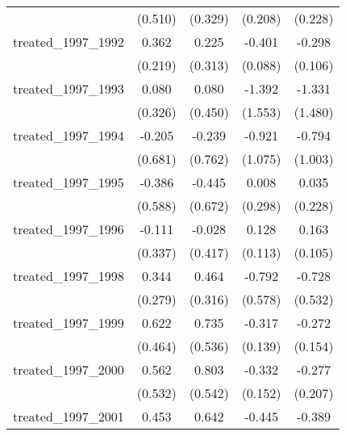 {\begin{tabular}{l*{4}{c}}
            &     (0.510)         &     (0.329)         &     (0.208)         &     (0.228)         \\
[1em]
treated\_1997\_1992&       0.362         &       0.225         &      -0.401\sym{***}&      -0.298\sym{**} \\
            &     (0.219)         &     (0.313)         &     (0.088)         &     (0.106)         \\
[1em]
treated\_1997\_1993&       0.080         &       0.080         &      -1.392         &      -1.331         \\
            &     (0.326)         &     (0.450)         &     (1.553)         &     (1.480)         \\
[1em]
treated\_1997\_1994&      -0.205         &      -0.239         &      -0.921         &      -0.794         \\
            &     (0.681)         &     (0.762)         &     (1.075)         &     (1.003)         \\
[1em]
treated\_1997\_1995&      -0.386         &      -0.445         &       0.008         &       0.035         \\
            &     (0.588)         &     (0.672)         &     (0.298)         &     (0.228)         \\
[1em]
treated\_1997\_1996&      -0.111         &      -0.028         &       0.128         &       0.163         \\
            &     (0.337)         &     (0.417)         &     (0.113)         &     (0.105)         \\
[1em]
treated\_1997\_1998&       0.344         &       0.464         &      -0.792         &      -0.728         \\
            &     (0.279)         &     (0.316)         &     (0.578)         &     (0.532)         \\
[1em]
treated\_1997\_1999&       0.622         &       0.735         &      -0.317\sym{*}  &      -0.272         \\
            &     (0.464)         &     (0.536)         &     (0.139)         &     (0.154)         \\
[1em]
treated\_1997\_2000&       0.562         &       0.803         &      -0.332\sym{*}  &      -0.277         \\
            &     (0.532)         &     (0.542)         &     (0.152)         &     (0.207)         \\
[1em]
treated\_1997\_2001&       0.453         &       0.642         &      -0.445\sym{*}  &      -0.389         \\

\end{tabular}}
